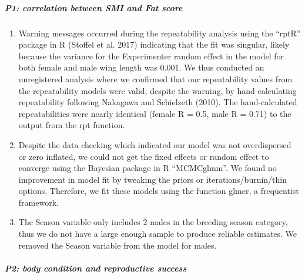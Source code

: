 \documentclass[
]{article}
\begin{document}
\hypertarget{p1-correlation-between-smi-and-fat-score}{%
\subparagraph{P1: correlation between SMI and Fat
score}\label{p1-correlation-between-smi-and-fat-score}}

\begin{enumerate}
\def\labelenumi{\arabic{enumi})}
\setcounter{enumi}{2}
\item
  Warning messages occurred during the repeatability analysis using the
  ``rptR'' package in R (Stoffel et al. 2017) indicating that the fit
  was singular, likely because the variance for the Experimenter random
  effect in the model for both female and male wing length was 0.001. We
  thus conducted an unregistered analysis where we confirmed that our
  repeatability values from the repeatability models were valid, despite
  the warning, by hand calculating repeatability following Nakagawa and
  Schielzeth (2010). The hand-calculated repeatabilities were nearly
  identical (female R = 0.5, male R = 0.71) to the output from the rpt
  function.
\item
  Despite the data checking which indicated our model was not
  overdispersed or zero inflated, we could not get the fixed effects or
  random effect to converge using the Bayesian package in R
  ``MCMCglmm''. We found no improvement in model fit by tweaking the
  priors or iterations/burnin/thin options. Therefore, we fit these
  models using the function glmer, a frequentist framework.
\item
  The Season variable only includes 2 males in the breeding season
  category, thus we do not have a large enough sample to produce
  reliable estimates. We removed the Season variable from the model for
  males.
\end{enumerate}

\hypertarget{p2-body-condition-and-reproductive-success}{%
\subparagraph{P2: body condition and reproductive
success}\label{p2-body-condition-and-reproductive-success}}
\end{document}
